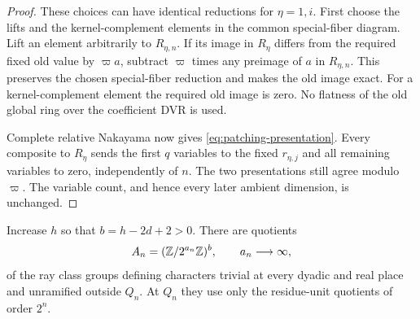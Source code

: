 \begin{proof}
These choices can have identical reductions for \(\eta=1,i\).
First choose the lifts and the kernel-complement elements in the
common special-fiber diagram. Lift an element arbitrarily to
\(R_{\eta,n}\). If its image in \(R_\eta\) differs from the required
fixed old value by \(\varpi a\), subtract \(\varpi\) times any
preimage of \(a\) in \(R_{\eta,n}\). This preserves the chosen
special-fiber reduction and makes the old image exact. For a
kernel-complement element the required old image is zero. No
flatness of the old global ring over the coefficient DVR is used.

Complete relative Nakayama now gives
\eqref{eq:patching-presentation}. Every composite to \(R_\eta\)
sends the first \(q\) variables to the fixed \(r_{\eta,j}\) and
all remaining variables to zero, independently of \(n\). The two
presentations still agree modulo \(\varpi\). The variable count,
and hence every later ambient dimension, is unchanged.
\end{proof}

\begin{lemma}\label{lem:twist-rank}
Increase $h$ so that \mbox{$b=h-2d+2>0$}. There are
quotients
\[
 A_n=(\mathbb Z/2^{a_n}\mathbb Z)^b,\qquad a_n\longrightarrow\infty,
\]
of the ray class groups defining characters trivial at every dyadic
and real place and unramified outside $Q_n$.  At $Q_n$ they use only
the residue-unit quotients of order $2^n$.
\end{lemma}

